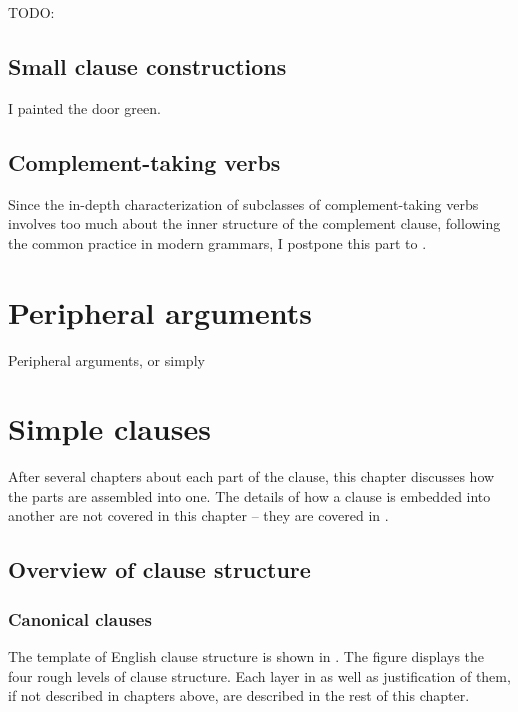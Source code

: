 \documentclass[UTF8, a4paper, oneside, scheme=plain]{ctexrep}
\newcommand*{\citesec}[1]{\S~{#1}}
\begin{document}
TODO: \citet[\citesec{4.1}]{dixon2005semantic}

\section{Small clause constructions}

\begin{exe}
    \ex I painted the door green.
\end{exe}

\section{Complement-taking verbs}

Since the in-depth characterization of subclasses of complement-taking verbs 
involves too much about the inner structure of the complement clause,
following the common practice in modern grammars,
I postpone this part to .

\chapter{Peripheral arguments}\label{chap:peripheral-arguments}

Peripheral arguments, or simply 

\chapter{Simple clauses}\label{chap:simple-clause}

After several chapters about each part of the clause,
this chapter discusses how the parts are assembled into one.
The details of how a clause is embedded into another are not covered in this chapter
-- they are covered in .

\section{Overview of clause structure}\label{sec:clause-template}

\subsection{Canonical clauses}

The template of English clause structure is shown in .
The figure displays the four rough levels of clause structure.
Each layer in  as well as justification of them,
if not described in chapters above, are described 
in the rest of this chapter.
\end{document}
